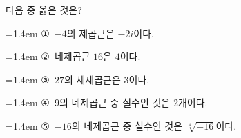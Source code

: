 다음 중 옳은 것은?
\par\medskip\par\noindent\hangindent=1.4em {\small ①}\ $-4$의 제곱근은 $-2i$이다.\par\noindent\hangindent=1.4em {\small ②}\ 네제곱근 $16$은 $4$이다.\par\noindent\hangindent=1.4em {\small ③}\ $27$의 세제곱근은 $3$이다.\par\noindent\hangindent=1.4em {\small ④}\ $9$의 네제곱근 중 실수인 것은 $2$개이다.\par\noindent\hangindent=1.4em {\small ⑤}\ $-16$의 네제곱근 중 실수인 것은 $\sqrt[4]{-16}$이다.\par\medskip
